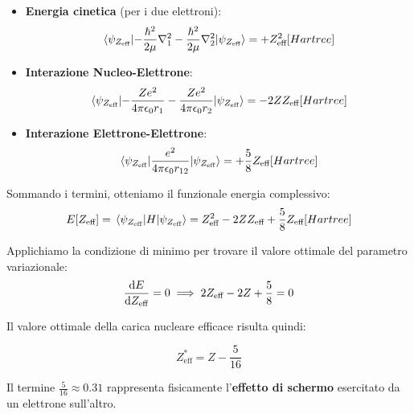 \begin{itemize}
    \item \textbf{Energia cinetica} (per i due elettroni):
    \begin{equation}
        \mel{\psi_{Z_{\text{eff}}}}{-\frac{\hbar^2}{2\mu} \nabla_1^2 - \frac{\hbar^2}{2\mu} \nabla_2^2}{\psi_{Z_{\text{eff}}}} = + Z_{\text{eff}}^2 [Hartree]
    \end{equation}
    
    \item \textbf{Interazione Nucleo-Elettrone}:
    \begin{equation}
        \mel{\psi_{Z_{\text{eff}}}}{-\frac{Z e^2}{4\pi \epsilon_0 r_1} - \frac{Z e^2}{4\pi \epsilon_0 r_2}}{\psi_{Z_{\text{eff}}}} = - 2 Z Z_{\text{eff}} [Hartree]
    \end{equation}
    
    \item \textbf{Interazione Elettrone-Elettrone}:
    \begin{equation}
        \mel{\psi_{Z_{\text{eff}}}}{\frac{e^2}{4\pi \epsilon_0 r_{12}}}{\psi_{Z_{\text{eff}}}} = + \frac{5}{8} Z_{\text{eff}} [Hartree]
    \end{equation}
\end{itemize}

Sommando i termini, otteniamo il funzionale energia complessivo:
\begin{equation}
    E[Z_{\text{eff}}] = \mel{\psi_{Z_{\text{eff}}}}{H}{\psi_{Z_{\text{eff}}}} = Z_{\text{eff}}^2 - 2 Z Z_{\text{eff}} + \frac{5}{8} Z_{\text{eff}} [Hartree]
\end{equation}

Applichiamo la condizione di minimo per trovare il valore ottimale del parametro variazionale:
\begin{equation}
    \dv{E}{Z_{\text{eff}}} = 0 \implies 2 Z_{\text{eff}} - 2 Z + \frac{5}{8} = 0
\end{equation}

Il valore ottimale della carica nucleare efficace risulta quindi:
\begin{importantbox}
    \begin{equation}
        Z_{\text{eff}}^* = Z - \frac{5}{16}
    \end{equation}
\end{importantbox}

Il termine \(\frac{5}{16} \approx 0.31\) rappresenta fisicamente l'\textbf{effetto di schermo} esercitato da un elettrone sull'altro. 

